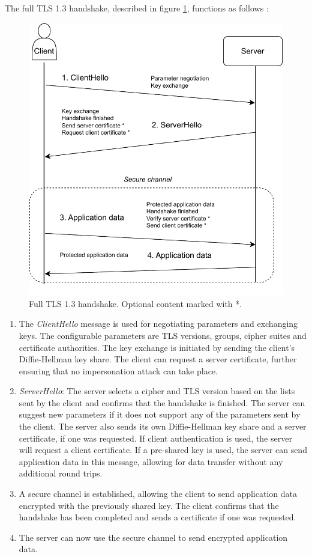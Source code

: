 The full TLS 1.3 handshake, described in figure \ref{tls}, functions as follows \citep{rescorla_transport_2018}:

\begin{figure}[b]
	\centering
	\includegraphics[height=120mm]{assets/tls_1.3_handshake.drawio.pdf}
	\caption{Full TLS 1.3 handshake. Optional content marked with *.}
	\label{tls}
\end{figure}

\begin{enumerate}
    \item The \textit{ClientHello} message is used for negotiating parameters and exchanging keys. The configurable parameters are TLS versions, groups, cipher suites and certificate authorities. The key exchange is initiated by sending the client's Diffie-Hellman key share. The client can request a server certificate, further ensuring that no impersonation attack can take place.
    \item \textit{ServerHello}: The server selects a cipher and TLS version based on the lists sent by the client and confirms that the handshake is finished. The server can suggest new parameters if it does not support any of the parameters sent by the client. The server also sends its own Diffie-Hellman key share and a server certificate, if one was requested. If client authentication is used, the server will request a client certificate. If a pre-shared key is used, the server can send application data in this message, allowing for data transfer without any additional round trips.
    \item A secure channel is established, allowing the client to send application data encrypted with the previously shared key. The client confirms that the handshake has been completed and sends a certificate if one was requested.
    \item The server can now use the secure channel to send encrypted application data.
\end{enumerate}
